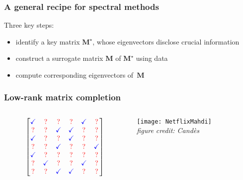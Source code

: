\documentclass[compress,
mathserif,wide,%
]{beamer}
\begin{document}
\begin{frame}
	\frametitle{A general recipe for spectral methods}
	
	Three key steps: 
	\vspace{1em}
	\begin{itemize}
		\item identify a key matrix $\bm{M}^{\star}$, whose eigenvectors disclose crucial information 
		\item construct a surrogate matrix $\bm{M}$ of $\bm{M}^{\star}$ using data 
		\item compute corresponding eigenvectors of~$\bm{M}$
	\end{itemize}
	
\end{frame}

\begin{frame}
\frametitle{Low-rank matrix completion}



\begin{columns}
\begin{column}{0.5\textwidth}
\[
 \begin{bmatrix}
   {\color{blue} \checkmark} & {\color{red} ?} &{\color{red} ?}  & {\color{red} ?} & {\color{blue} \checkmark} & {\color{red} ?} \\
   {\color{red} ?} & {\color{red} ?} & {\color{blue} \checkmark} & {\color{blue} \checkmark} & {\color{red} ?} & {\color{red} ?} \\
   {\color{blue} \checkmark} & {\color{red} ?} & {\color{red} ?} & {\color{blue} \checkmark} & {\color{red} ?} & {\color{red} ?} \\
   {\color{red} ?} & {\color{red} ?} & {\color{blue} \checkmark}  & {\color{red} ?} &{\color{red} ?}  & {\color{blue} \checkmark} \\
   {\color{blue} \checkmark}  &  {\color{red} ?} & {\color{red} ?} & {\color{red} ?}  & {\color{red} ?} & {\color{red} ?} \\
   {\color{red} ?} & {\color{blue} \checkmark} &{\color{red} ?}  & {\color{red} ?} & {\color{blue} \checkmark} & {\color{red} ?} \\
   {\color{red} ?}  &{\color{red} ?} & {\color{blue} \checkmark} &
   {\color{blue} \checkmark} & {\color{red} ?} & {\color{red} ?}
\end{bmatrix}
\]
\end{column}

\begin{column}{0.5\textwidth}  
\begin{center}
\texttt{[image: NetflixMahdi]} \\
\hfill {\footnotesize\em figure credit: Cand\`es ~~}
\end{center}
\end{column}


\end{columns}
\end{frame}
\end{document}
